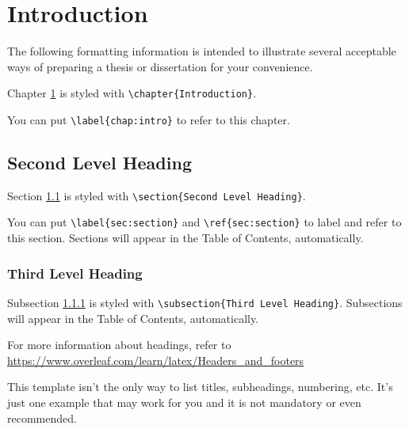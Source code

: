 

\chapter{Introduction}\label{chap:intro}
The following formatting information is intended to illustrate several acceptable ways of preparing a thesis or dissertation for your convenience.

Chapter \ref{chap:intro} is styled with \verb|\chapter{Introduction}|. \par
You can put \verb|\label{chap:intro}| to refer to this chapter.

\section{Second Level Heading}\label{sec:section}

Section \ref{sec:section} is styled with \verb|\section{Second Level Heading}|. \par
You can put \verb|\label{sec:section}| and \verb|\ref{sec:section}| to label and refer to this section.
Sections will appear in the Table of Contents, automatically.

%
\subsection{Third Level Heading}\label{subs:subsection}
Subsection \ref{subs:subsection} is styled with \verb|\subsection{Third Level Heading}|.
Subsections will appear in the Table of Contents, automatically.

For more information about headings, refer to \url{https://www.overleaf.com/learn/latex/Headers_and_footers}

This template isn’t the only way to list titles, subheadings, numbering, etc.
It’s just one example that may work for you and it is not mandatory or even recommended.

